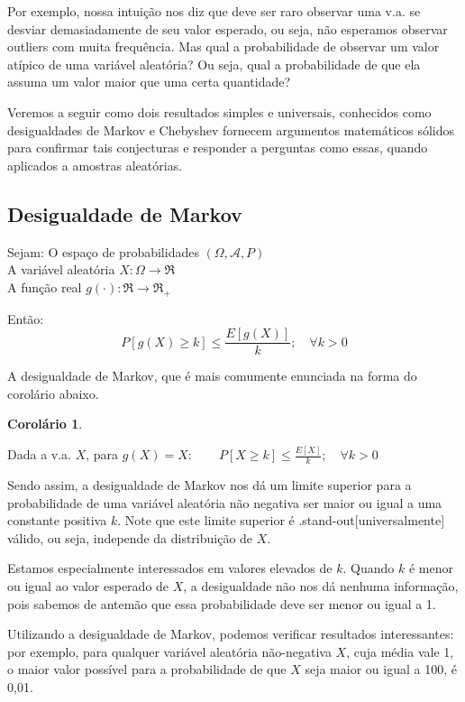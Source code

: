 \documentclass[
]{book}
\newtheorem{corollary}{Corolário}[chapter]
\theoremstyle{definition}
\theoremstyle{definition}
\theoremstyle{definition}
\theoremstyle{remark}
\begin{document}
Por exemplo, nossa intuição nos diz que deve ser raro observar uma v.a. se desviar demasiadamente de seu valor esperado, ou seja, não esperamos observar outliers com muita frequência. Mas qual a probabilidade de observar um valor atípico de uma variável aleatória? Ou seja, qual a probabilidade de que ela assuma um valor maior que uma certa quantidade?

Veremos a seguir como dois resultados simples e universais, conhecidos como desigualdades de Markov e Chebyshev fornecem argumentos matemáticos sólidos para confirmar tais conjecturas e responder a perguntas como essas, quando aplicados a amostras aleatórias.

\hypertarget{desigualdade-de-markov}{%
\subsection*{Desigualdade de Markov}\label{desigualdade-de-markov}}

Sejam:
O espaço de probabilidades \({(\Omega, \mathcal{A}, P)}\)\\
A variável aleatória \({X: \Omega \rightarrow \Re}\)\\
A função real \({g(\cdot): \Re \rightarrow \Re_{+}}\)

Então:
\[{P[g(X) \geq k] \leq \frac{E[g(X)]}{k};  \quad \forall k>0}\]

A desigualdade de Markov, que é mais comumente enunciada na forma do corolário abaixo.

\begin{corollary}
\protect\hypertarget{cor:unnamed-chunk-19}{}{\label{cor:unnamed-chunk-19} }
\end{corollary}

Dada a v.a. \(X\), para \({g(X) = X: \qquad P[X \geq k] \leq \frac{E[X]}{k}; \quad \forall k>0}\)

Sendo assim, a desigualdade de Markov nos dá um limite superior para a probabilidade de uma variável aleatória não negativa ser maior ou igual a uma constante positiva \(k\). Note que este limite superior é .stand-out{[}universalmente{]} válido, ou seja, independe da distribuição de \(X\).

Estamos especialmente interessados em valores elevados de \(k\). Quando \(k\) é menor ou igual ao valor esperado de \(X\), a desigualdade não nos dá nenhuma informação, pois sabemos de antemão que essa probabilidade deve ser menor ou igual a 1.

Utilizando a desigualdade de Markov, podemos verificar resultados interessantes: por exemplo, para qualquer variável aleatória não-negativa \(X\), cuja média vale 1, o maior valor possível para a probabilidade de que \(X\) seja maior ou igual a 100, é 0,01.
\end{document}
